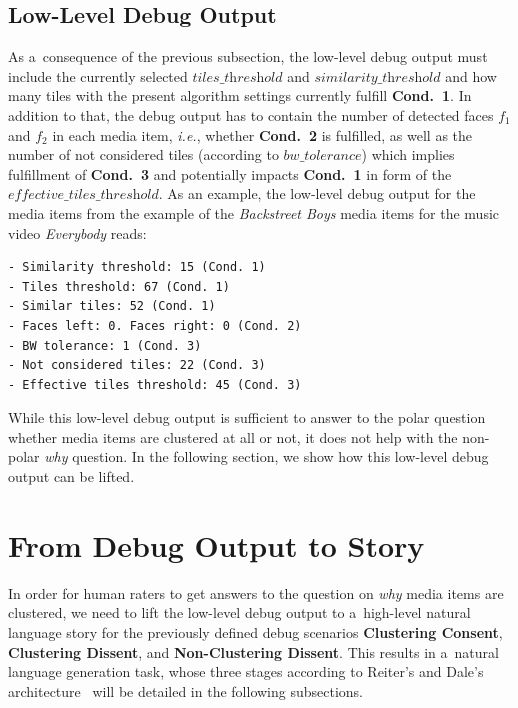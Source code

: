\documentclass{article}
\begin{document}
\subsection{Low-Level Debug Output}
\label{sec:low-level-debug-output}
As a~consequence of the previous subsection, the low-level debug output must include the currently selected $\textit{tiles\_threshold}$ and $\textit{similarity\_threshold}$ and how many tiles with the present algorithm settings currently fulfill \textbf{Cond.~1}. In addition to that, the debug output has to contain the number of detected faces $f_1$ and $f_2$ in each media item, \emph{i.e.}, whether \textbf{Cond.~2} is fulfilled, as well as the number of
not considered tiles (according to $\textit{bw\_tolerance}$) which implies fulfillment of \textbf{Cond.~3} and potentially impacts \textbf{Cond.~1} in form of the $\textit{effective\_tiles\_threshold}$. As an example, the low-level debug output for the media items from the example of the \emph{Backstreet Boys} media items for the music video \emph{Everybody} reads:
\begin{verbatim}
- Similarity threshold: 15 (Cond. 1)
- Tiles threshold: 67 (Cond. 1)
- Similar tiles: 52 (Cond. 1)
- Faces left: 0. Faces right: 0 (Cond. 2)
- BW tolerance: 1 (Cond. 3)
- Not considered tiles: 22 (Cond. 3)
- Effective tiles threshold: 45 (Cond. 3)
\end{verbatim}

While this low-level debug output is sufficient to answer to the polar question whether media items are clustered at all or not, it does not help with the non-polar \emph{why} question. In the following section, we show how this low-level debug output can be lifted.


\section{From Debug Output to Story}
\label{sec:from-debug-output-to-story}
In order for human raters to get answers to the question on \emph{why} media items are clustered, we need to lift the low-level debug output to a~high-level natural language story for the previously defined debug scenarios \textbf{Clustering Consent}, \textbf{Clustering Dissent}, and \textbf{Non-Clustering Dissent}. This results in a~natural language generation task, whose three stages according to Reiter's and Dale's architecture~\cite{reiter2000building} will be detailed in the following subsections.
\end{document}
